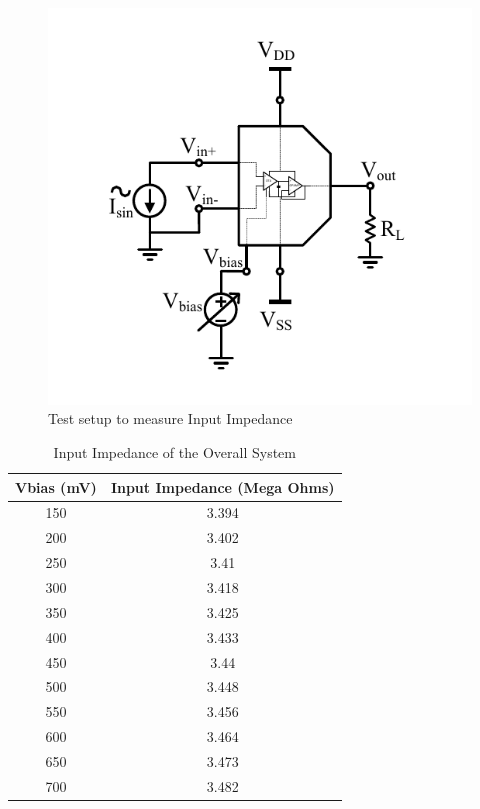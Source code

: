 \begin{figure} [H]
\centering
\includegraphics[scale=1]{Figures/Test_Benches/Overall/ZIN.pdf}
\caption{Test setup to measure Input Impedance}
\label{fig:TB_ZIN}
\end{figure}

\begin{table} [H]
\centering
\begin{tabular}{@{}cc@{}}
\toprule
Vbias (mV)			& Input Impedance (Mega Ohms)	\\ \midrule
150					& 3.394  \\
200					& 3.402  \\
250					& 3.41   \\
300					& 3.418	 \\
350					& 3.425	 \\
400					& 3.433	 \\
450					& 3.44  \\
500					& 3.448 \\
550					& 3.456 \\
600					& 3.464 \\
650					& 3.473 \\
700 				& 3.482 \\
\bottomrule
\end{tabular}
\caption{Input Impedance of the Overall System}
\label{tab:ZIN}
\end{table}

